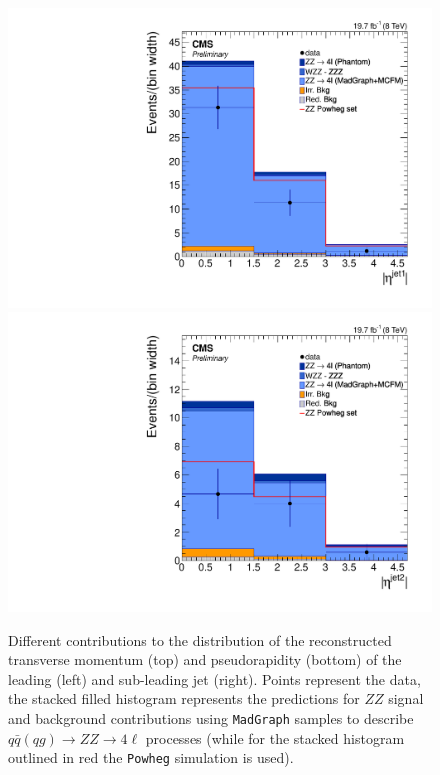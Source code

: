 \begin{figure}[hbtp]
\begin{center}
    \includegraphics[width=\cmsFigWidth]{Figures/EtaJet1_mad}
    \includegraphics[width=\cmsFigWidth]{Figures/EtaJet2_mad}
    \caption{Different contributions to the distribution of the reconstructed transverse momentum (top) and pseudorapidity (bottom) of the leading (left) and  sub-leading jet (right). Points represent the data, the stacked filled histogram represents the predictions for $ZZ$ signal and background contributions using \texttt{MadGraph} samples to describe $q\bar{q}(qg)\to ZZ\to 4\ell$ processes (while for the stacked histogram outlined in red the \texttt{Powheg} simulation is used).}
    \label{fig:sig_recoPt}
  \end{center}
\end{figure}


